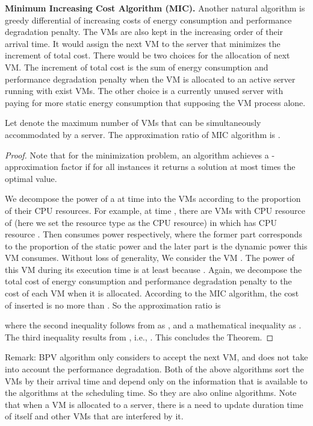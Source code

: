 \documentclass[10pt,journal]{IEEEtran}
\begin{document}
\textbf{Minimum Increasing Cost Algorithm (MIC).} Another natural algorithm is greedy differential of increasing costs of energy consumption and performance degradation penalty. The VMs are also kept in the increasing order of their arrival time. It would assign the next VM to the server that minimizes the increment of total cost. There would be two choices for the allocation of next VM. The increment of total cost is the sum of energy consumption and performance degradation penalty when the VM is allocated to an active server running with exist VMs. The other choice is a currently unused server with paying for more static energy consumption that supposing the VM process alone.
\newtheorem{lemma}{Lemma}
\begin{theorem}
Let  denote the maximum number of VMs that can be simultaneously accommodated by a server. The approximation ratio of MIC algorithm is . \label{theorem:approximation}
\end{theorem}
\begin{proof}
Note that for the minimization problem, an algorithm achieves a -approximation factor if for all instances it returns a solution at most  times the optimal value.

We decompose the power of a  at time  into the VMs according to the proportion of their CPU resources. For example, at time , there are  VMs with CPU resource of   (here we set the resource type  as the CPU resource) in  which has CPU resource . Then  consumes  power respectively, where the former part corresponds to the proportion of the static power and the later part is the dynamic power this VM consumes. Without loss of generality, We consider the VM . The power of this VM during its execution time is at least  because . Again, we decompose the total cost of energy consumption and performance degradation penalty to the cost of each VM when it is allocated. According to the MIC algorithm, the cost of inserted  is no more than . So the approximation ratio is

where the second inequality follows from  as , and a mathematical inequality  as . The third inequality results from , i.e., . This concludes the Theorem.
\end{proof}
Remark: BPV algorithm only considers to accept the next VM, and does not take into account the performance degradation. Both of the above algorithms sort the VMs by their arrival time and depend only on the information that is available to the algorithms at the scheduling time. So they are also online algorithms. Note that when a VM is allocated to a server, there is a need to update duration time of itself and other VMs that are interfered by it.
\end{document}
